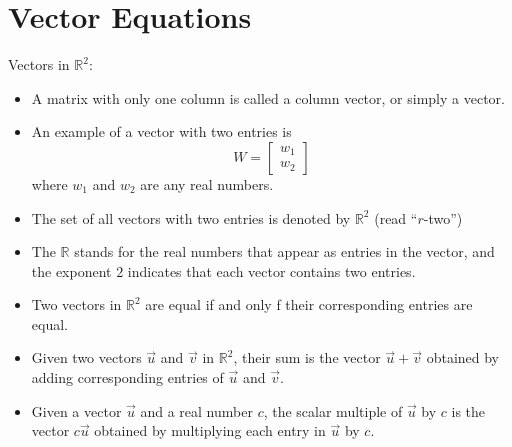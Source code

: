 \documentclass[../linalg.tex]{subfiles}
\begin{document}
\section{Vector Equations}
Vectors in $\mathbb{R}^2$:
\begin{itemize}
    \item A matrix with only one column is called a column vector, or simply a vector.
    \item An example of a vector with two entries is
    \[ W = \begin{bmatrix}
        w_1\\w_2
    \end{bmatrix}\]
    where $w_1$ and $w_2$ are any real numbers.
    \item The set of all vectors with two entries is denoted by $\mathbb{R}^2$ (read ``$r$-two'')
\end{itemize}

\begin{itemize}
    \item The $\mathbb{R}$ stands for the real numbers that appear as entries in the vector, and the exponent $2$ indicates that each vector contains two entries.
    \item Two vectors in $\mathbb{R}^2$ are equal if and only f their corresponding entries are equal.
    \item Given two vectors $\vec{u}$ and $\vec{v}$ in $\mathbb{R}^2$, their sum is the vector $\vec{u}+\vec{v}$ obtained by adding corresponding entries of $\vec{u}$ and $\vec{v}$.
    \item Given a vector $\vec{u}$ and a real number $c$, the scalar multiple of $\vec{u}$ by $c$ is the vector $c\vec{u}$ obtained by multiplying each entry in $\vec{u}$ by $c$.
\end{itemize}
\end{document}
